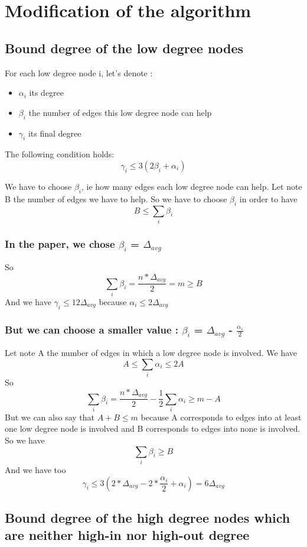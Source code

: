 \documentclass{article}
\begin{document}
\section{Modification of the algorithm}

\subsection{Bound degree of the low degree nodes}

For each low degree node i, let's denote :
\begin{itemize}
    \item $\alpha_i$ its degree
    \item $\beta_i$ the number of edges this low degree node can help
    \item $\gamma_i$ its final degree
\end{itemize}
The following condition holds: $$\gamma_i \leq 3(2\beta_i + \alpha_i)$$

We have to choose $\beta_i$, ie how many edges each low degree node
can help. Let note B the number of edges we have to help.
So we have to choose $\beta_i$ in order to have $$B \leq \sum_{i} \beta_i$$

\subsubsection{In the paper, we chose $\beta_i$ = $\Delta_{avg}$}

So $$\sum_{i} \beta_i = \frac{n*\Delta_{avg}}{2} = m \geq B$$
And we have $\gamma_i \leq 12\Delta_{avg}$ because $\alpha_i \leq 2\Delta_{avg}$

\subsubsection{But we can choose a smaller value : $\beta_i$ = $\Delta_{avg}$ - $\frac{\alpha_i}{2}$}

Let note A the number of edges in which a low degree node is involved.
We have $$A \leq \sum_{i} \alpha_i \leq 2A$$
So $$\sum_{i} \beta_i = \frac{n*\Delta_{avg}}{2} - \frac{1}{2}\sum_{i} \alpha_i \geq m - A$$
But we can also say that $ A + B \leq m$ because A corresponds to edges
into at least one low degree node is involved and B corresponds to edges
into none is involved. So we have $$\sum_{i} \beta_i \geq B$$
And we have too
$$\gamma_i \leq 3(2*\Delta_{avg}-2*\frac{\alpha_i}{2}+\alpha_i) = 6\Delta_{avg}$$

\subsection{Bound degree of the high degree nodes which are neither high-in nor high-out degree}
\end{document}
